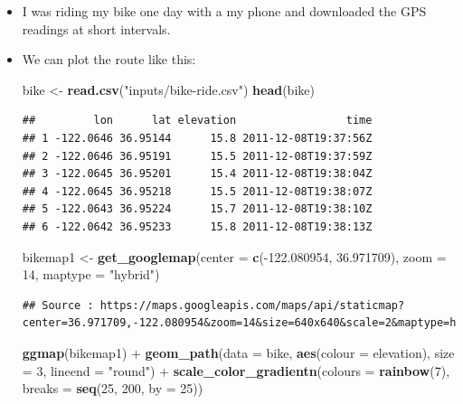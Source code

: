 \documentclass[]{book}
\newenvironment{Shaded}{\begin{snugshade}}{\end{snugshade}}
\newcommand{\KeywordTok}[1]{\textcolor[rgb]{0.13,0.29,0.53}{\textbf{{#1}}}}
\newcommand{\DataTypeTok}[1]{\textcolor[rgb]{0.13,0.29,0.53}{{#1}}}
\newcommand{\DecValTok}[1]{\textcolor[rgb]{0.00,0.00,0.81}{{#1}}}
\newcommand{\FloatTok}[1]{\textcolor[rgb]{0.00,0.00,0.81}{{#1}}}
\newcommand{\StringTok}[1]{\textcolor[rgb]{0.31,0.60,0.02}{{#1}}}
\newcommand{\NormalTok}[1]{{#1}}
\theoremstyle{definition}
\theoremstyle{definition}
\theoremstyle{remark}
\begin{document}
\begin{itemize}
\item
  I was riding my bike one day with a my phone and downloaded the GPS
  readings at short intervals.
\item
  We can plot the route like this:

\begin{Shaded}
\begin{Highlighting}[]
\NormalTok{bike <-}\StringTok{ }\KeywordTok{read.csv}\NormalTok{(}\StringTok{"inputs/bike-ride.csv"}\NormalTok{)}
\KeywordTok{head}\NormalTok{(bike)}
\end{Highlighting}
\end{Shaded}

\begin{verbatim}
##         lon      lat elevation                 time
## 1 -122.0646 36.95144      15.8 2011-12-08T19:37:56Z
## 2 -122.0646 36.95191      15.5 2011-12-08T19:37:59Z
## 3 -122.0645 36.95201      15.4 2011-12-08T19:38:04Z
## 4 -122.0645 36.95218      15.5 2011-12-08T19:38:07Z
## 5 -122.0643 36.95224      15.7 2011-12-08T19:38:10Z
## 6 -122.0642 36.95233      15.8 2011-12-08T19:38:13Z
\end{verbatim}

\begin{Shaded}
\begin{Highlighting}[]
\NormalTok{bikemap1 <-}\StringTok{ }\KeywordTok{get_googlemap}\NormalTok{(}\DataTypeTok{center =} \KeywordTok{c}\NormalTok{(-}\FloatTok{122.080954}\NormalTok{, }\FloatTok{36.971709}\NormalTok{), }\DataTypeTok{zoom =} \DecValTok{14}\NormalTok{, }\DataTypeTok{maptype =} \StringTok{"hybrid"}\NormalTok{)}
\end{Highlighting}
\end{Shaded}

\begin{verbatim}
## Source : https://maps.googleapis.com/maps/api/staticmap?center=36.971709,-122.080954&zoom=14&size=640x640&scale=2&maptype=hybrid
\end{verbatim}

\begin{Shaded}
\begin{Highlighting}[]
\KeywordTok{ggmap}\NormalTok{(bikemap1) +}\StringTok{ }
\StringTok{  }\KeywordTok{geom_path}\NormalTok{(}\DataTypeTok{data =} \NormalTok{bike, }\KeywordTok{aes}\NormalTok{(}\DataTypeTok{colour =} \NormalTok{elevation), }\DataTypeTok{size =} \DecValTok{3}\NormalTok{, }\DataTypeTok{lineend =} \StringTok{"round"}\NormalTok{) +}\StringTok{ }
\StringTok{  }\KeywordTok{scale_color_gradientn}\NormalTok{(}\DataTypeTok{colours =} \KeywordTok{rainbow}\NormalTok{(}\DecValTok{7}\NormalTok{), }\DataTypeTok{breaks =} \KeywordTok{seq}\NormalTok{(}\DecValTok{25}\NormalTok{, }\DecValTok{200}\NormalTok{, }\DataTypeTok{by =} \DecValTok{25}\NormalTok{))}
\end{Highlighting}
\end{Shaded}


\end{itemize}
\end{document}
